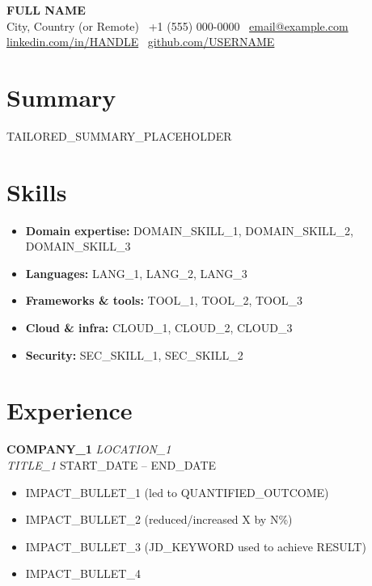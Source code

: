 \documentclass[10pt, letterpaper]{article}
\newcommand{\resumeheader}[5]{%
  \begin{center}
    {\LARGE\bfseries #1}\\[4pt]
    #2 \textbullet\ #3 \textbullet\ \href{mailto:#4}{#4}\\[2pt]
    #5
  \end{center}
  \vspace{4pt}
}
\newcommand{\roleentry}[4]{%
  \textbf{#1} \hfill \textit{#3}\\
  \textit{#2} \hfill #4
  \vspace{2pt}
}
\begin{document}

\resumeheader
  {FULL NAME}
  {City, Country (or Remote)}
  {+1 (555) 000-0000}
  {email@example.com}
  {\href{https://linkedin.com/in/HANDLE}{linkedin.com/in/HANDLE} \textbullet\ \href{https://github.com/USERNAME}{github.com/USERNAME}}

\section{Summary}

TAILORED_SUMMARY_PLACEHOLDER

\section{Skills}

\begin{itemize}[leftmargin=0em, label={}]
  \item \textbf{Domain expertise:} DOMAIN_SKILL_1, DOMAIN_SKILL_2, DOMAIN_SKILL_3
  \item \textbf{Languages:} LANG_1, LANG_2, LANG_3
  \item \textbf{Frameworks \& tools:} TOOL_1, TOOL_2, TOOL_3
  \item \textbf{Cloud \& infra:} CLOUD_1, CLOUD_2, CLOUD_3
  \item \textbf{Security:} SEC_SKILL_1, SEC_SKILL_2  %
\end{itemize}

\section{Experience}

\roleentry{COMPANY\_1}{TITLE\_1}{LOCATION\_1}{START\_DATE -- END\_DATE}
\begin{itemize}
  \item IMPACT\_BULLET\_1 (led to QUANTIFIED\_OUTCOME)
  \item IMPACT\_BULLET\_2 (reduced/increased X by N\%)
  \item IMPACT\_BULLET\_3 (JD\_KEYWORD used to achieve RESULT)
  \item IMPACT\_BULLET\_4
\end{itemize}
\end{document}

